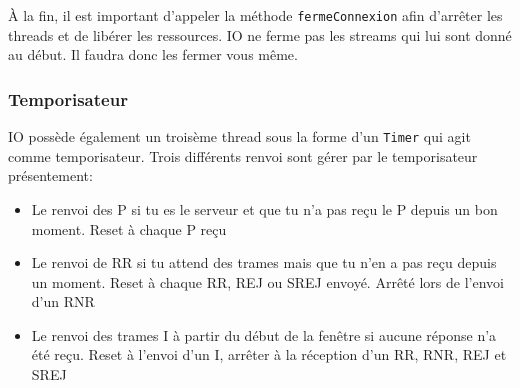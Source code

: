 \documentclass{article}
\begin{document}
    À la fin, il est important d'appeler la méthode \verb#fermeConnexion# afin d'arrêter les threads et de libérer les ressources. IO ne ferme pas les streams qui lui sont donné au début. Il faudra donc les fermer vous même.

    \subsubsection{Temporisateur}
    IO possède également un troisème thread sous la forme d'un \verb#Timer# qui agit comme temporisateur. Trois différents renvoi sont gérer par le temporisateur présentement:
    \begin{itemize}
        \item Le renvoi des P si tu es le serveur et que tu n'a pas reçu le P depuis un bon moment. Reset à chaque P reçu
        \item Le renvoi de RR si tu attend des trames mais que tu n'en a pas reçu depuis un moment. Reset à chaque RR, REJ ou SREJ envoyé. Arrêté lors de l'envoi d'un RNR
        \item Le renvoi des trames I à partir du début de la fenêtre si aucune réponse n'a été reçu. Reset à l'envoi d'un I, arrêter à la réception d'un RR, RNR, REJ et SREJ
    \end{itemize}
\end{document}
